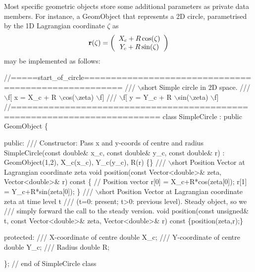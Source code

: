 Most specific geometric objects store some additional parameters as private data members. For instance, a {\ttfamily Geom\+Object} that represents a 2D circle, parametrised by the 1D Lagrangian coordinate $ \zeta $ as \[ {\bf r}(\zeta)= \left( \begin{array}{c} X_c + R \cos(\zeta) \\ Y_c + R \sin(\zeta) \end{array} \right) \] may be implemented as follows\+:

 
\begin{DoxyCodeInclude}
\textcolor{comment}{//=====start\_of\_circle=====================================================}
\textcolor{comment}{/// \(\backslash\)short Simple circle in 2D space.}
\textcolor{comment}{}\textcolor{comment}{/// \(\backslash\)f[ x = X\_c + R \(\backslash\)cos(\(\backslash\)zeta)  \(\backslash\)f]}
\textcolor{comment}{}\textcolor{comment}{/// \(\backslash\)f[ y = Y\_c + R \(\backslash\)sin(\(\backslash\)zeta)  \(\backslash\)f]}
\textcolor{comment}{}\textcolor{comment}{//=========================================================================}
\textcolor{keyword}{class }SimpleCircle : \textcolor{keyword}{public} GeomObject
\{

\textcolor{keyword}{public}:
\textcolor{comment}{}
\textcolor{comment}{ /// Constructor:  Pass x and y-coords of centre and radius}
\textcolor{comment}{} SimpleCircle(\textcolor{keyword}{const} \textcolor{keywordtype}{double}& x\_c, \textcolor{keyword}{const} \textcolor{keywordtype}{double}& y\_c, 
               \textcolor{keyword}{const} \textcolor{keywordtype}{double}& r) : GeomObject(1,2), X\_c(x\_c), Y\_c(y\_c), R(r)
  \{\}
\textcolor{comment}{}
\textcolor{comment}{ /// \(\backslash\)short Position Vector at Lagrangian coordinate zeta }
\textcolor{comment}{} \textcolor{keywordtype}{void} position(\textcolor{keyword}{const} Vector<double>& zeta, Vector<double>& r)\textcolor{keyword}{ const}
\textcolor{keyword}{  }\{
   \textcolor{comment}{// Position vector}
   r[0] = X\_c+R*cos(zeta[0]);
   r[1] = Y\_c+R*sin(zeta[0]);
  \}
\textcolor{comment}{}
\textcolor{comment}{ /// \(\backslash\)short Position Vector at Lagrangian coordinate zeta  at time level t}
\textcolor{comment}{ /// (t=0: present; t>0: previous level). Steady object, so we }
\textcolor{comment}{ /// simply forward the call to the steady version.}
\textcolor{comment}{} \textcolor{keywordtype}{void} position(\textcolor{keyword}{const} \textcolor{keywordtype}{unsigned}& t, \textcolor{keyword}{const} Vector<double>& zeta,
               Vector<double>& r)\textcolor{keyword}{ const}
\textcolor{keyword}{  }\{position(zeta,r);\}

\textcolor{keyword}{protected}:
\textcolor{comment}{}
\textcolor{comment}{ /// X-coordinate of centre}
\textcolor{comment}{} \textcolor{keywordtype}{double} X\_c;
\textcolor{comment}{}
\textcolor{comment}{ /// Y-coordinate of centre}
\textcolor{comment}{} \textcolor{keywordtype}{double} Y\_c;
\textcolor{comment}{}
\textcolor{comment}{ /// Radius}
\textcolor{comment}{} \textcolor{keywordtype}{double} R;

\}; \textcolor{comment}{// end of SimpleCircle class}

\end{DoxyCodeInclude}


